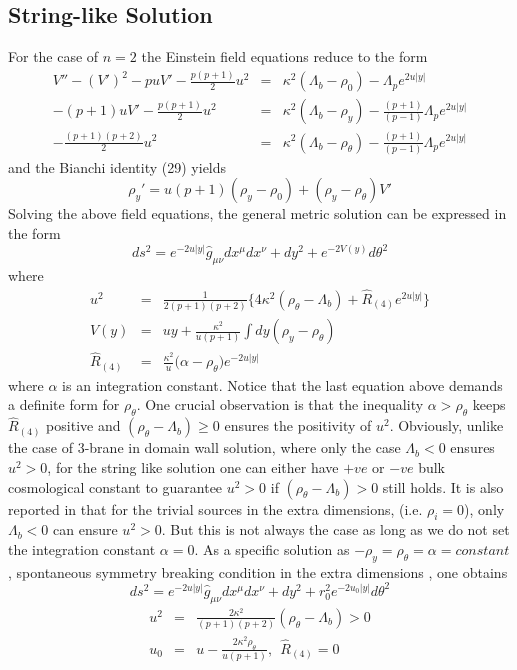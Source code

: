 \documentclass[a4paper,12pt]{article}
\newcommand {\nn} {\nonumber}
\begin{document}
\subsection{String-like Solution}
   For the case of $n=2$ the Einstein field equations reduce to the form 
\begin{eqnarray}
V''- (V')^2-p u V'- \frac{p(p+1)}{2} u^2 
&=&\kappa^2 (\Lambda_b-\rho_0)-\Lambda_p e^{2u|y|}\\
-(p+1) u V'-\frac{p(p+1)}{2} u^2 
&=& \kappa^2(\Lambda_b-\rho_y)-\frac{(p+1)}{(p-1)}\Lambda_p e^{2u|y|}\\
-\frac{(p+1)(p+2)}{2} u^2
&=& \kappa^2(\Lambda_b-\rho_{\theta})-\frac{(p+1)}{(p-1)}\Lambda_p e^{2u|y|}
\end{eqnarray}
and the Bianchi identity (29) yields
\begin{equation}
\rho_y'=u(p+1)(\rho_y-\rho_0)+(\rho_y-\rho_{\theta})V'
\end{equation}
Solving the above field equations, the general metric solution can be
expressed in the form
\begin{equation}
ds^2= e^{-2u|y|}\hat{g}_{\mu\nu}dx^\mu dx^\nu + dy^2 
+ e^{-2V(y)} d\theta^2
\end{equation}
where
\begin{eqnarray}
u^2&=&\frac{1}{2(p+1)(p+2)}\big\{4\kappa^2(\rho_{\theta}-\Lambda_b)
+\hat R_{(4)} e^{2u|y|}\big\}\\
V(y)&=& u y +\frac{\kappa^2}{u(p+1)}\int dy (\rho_y-\rho_{\theta})\\
\hat R_{(4)}&=&\frac{\kappa^2}{u}\big(\alpha-\rho_{\theta}\big)e^{-2u|y|}
\end{eqnarray}
where $\alpha$ is an integration constant. Notice that the last equation 
above demands a definite form for $\rho_{\theta}$. One crucial observation
is that the inequality $\alpha > \rho_{\theta}$ keeps $\hat{R}_{(4)}$ 
positive and $(\rho_{\theta}-\Lambda_b)\geq 0$ ensures the positivity of 
$u^2$. Obviously, unlike the case of $3$-brane in domain wall solution, 
where only the case $\Lambda_b<0$ ensures $u^2>0$, for the string like 
solution one can either have $+ve$ or $-ve$ bulk cosmological constant 
to guarantee $u^2>0$ if $(\rho_{\theta}-\Lambda_b)>0$ still holds. It is 
also reported in \cite{ODA} that for the trivial sources in the extra 
dimensions, (i.e. $\rho_i=0$), only $\Lambda_b<0$ can ensure $u^2>0$. 
But this is not always the case as long as we do not set the integration 
constant $\alpha=0$. As a specific solution as $-\rho_y=\rho_{\theta}=
\alpha=constant$, spontaneous symmetry breaking condition in the extra 
dimensions \cite{RGR,ODA}, one obtains
\begin{equation}
ds^2= e^{-2u|y|}\hat{g}_{\mu\nu}dx^\mu dx^\nu + dy^2 
+ r_0^2 e^{-2u_0|y|} d\theta^2
\end{equation}
\begin{eqnarray}
u^2&=&\frac{2\kappa^2}{(p+1)(p+2)}(\rho_{\theta}-\Lambda_b)>0\nn\\
u_0&=&u-\frac{2\kappa^2 \rho_{\theta}}{u(p+1)},~~ \hat{R}_{(4)}=0    
\end{eqnarray}  
\end{document}
